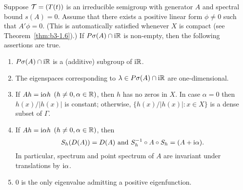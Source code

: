 \begin{theorem}\label{thm:b3-3.6}
%
	Suppose $\mathcal{T} = (T(t))$ is an irreducible semigroup with generator $A$ and spectral bound $s(A) = 0$.
	Assume that there exists a positive linear form $\phi \neq 0$ such that $A'\phi = 0$. 
    (This is automatically satisfied whenever $X$ is compact (see Theorem~\ref{thm:b3-1.6}).)
	If $P\sigma(A)\cap \mathrm{i}\mathbb{R}$ is non-empty, then the following assertions are true.
	\begin{enumerate}[\upshape (i)]
		\item 
		$P\sigma(A)\cap \mathrm{i}\mathbb{R}$ is a (additive) subgroup of $\mathrm{i} \mathbb{R}$.
	
		\item 
		The eigenspaces corresponding to $\lambda \in P\sigma(A)\cap \mathrm{i}\mathbb{R}$ are one-dimensional.
	
		\item 
		If $Ah = \mathrm{i}\alpha h$ $(h \neq 0, \alpha \in \mathbb{R})$, then $h$ has no zeros in $X$.
		In case $\alpha = 0$ then $h(x)/|h(x)|$ is constant; otherwise, $\{h(x)/|h(x)| \colon x \in X\}$ is a dense subset of $\Gamma$.
	
		\item 
		If $Ah = \mathrm{i}\alpha h$ $(h \neq 0, \alpha \in \mathbb{R})$, then
		\begin{equation}\label{eq:b3-3.5}
			S_{h}(D(A)) = D(A) \text{ and } S_{h}^{-1}\circ A \circ S_{h} = (A + \mathrm{i}\alpha).
		\end{equation}
		In particular, spectrum and point spectrum of $A$ are invariant under translations by $\mathrm{i} \alpha$.
	
		\item 
		$0$ is the only eigenvalue admitting a positive eigenfunction.
	\end{enumerate}
\end{theorem}
